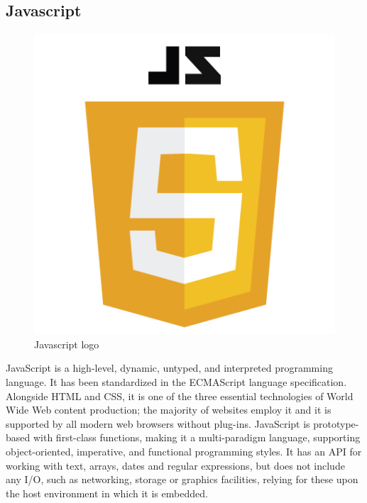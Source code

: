 \subsection{Javascript}
\begin{figure}[h]
\centering \includegraphics[scale=0.3]{input/images/JS.png}
\caption{Javascript logo}
\end{figure}
JavaScript is a high-level, dynamic, untyped, and interpreted programming language. It has been standardized in the ECMAScript language specification. Alongside HTML and CSS, it is one of the three essential technologies of World Wide Web content production; the majority of websites employ it and it is supported by all modern web browsers without plug-ins. JavaScript is prototype-based with first-class functions, making it a multi-paradigm language, supporting object-oriented, imperative, and functional programming styles. It has an API for working with text, arrays, dates and regular expressions, but does not include any I/O, such as networking, storage or graphics facilities, relying for these upon the host environment in which it is embedded.


